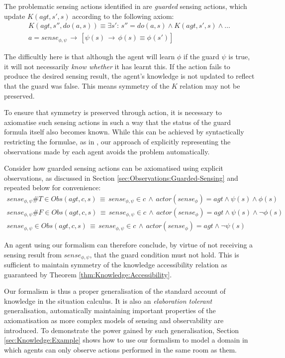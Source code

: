 The problematic sensing actions identified in \citep{Petrick06thesis}
are \emph{guarded} sensing actions, which update $K(agt,s',s)$ according
to the following axiom:\begin{gather*}
K(agt,s'',do(a,s))\equiv\exists s':\, s''=do(a,s)\wedge K(agt,s',s)\wedge\dots\\
a=sense_{\phi,\psi}\,\rightarrow\,\left[\psi(s)\,\rightarrow\,\phi(s)\equiv\phi_{}(s')\right]\end{gather*}


The difficultly here is that although the agent will learn $\phi$
if the guard $\psi$ is true, it will not necessarily \emph{know whether}
it has learnt this. If the action fails to produce the desired sensing
result, the agent's knowledge is not updated to reflect that the guard
was false. This means symmetry of the $K$ relation may not be preserved.

To ensure that symmetry is preserved through action, it is necessary
to axiomatise such sensing actions in such a way that the status of
the guard formula itself also becomes known. While this can be achieved
by syntactically restricting the formulae, as in \citep{Petrick06thesis},
our approach of explicitly representing the observations made by each
agent avoids the problem automatically.

Consider how guarded sensing actions can be axiomatised using explicit
observations, as discussed in Section \ref{sec:Observations:Guarded-Sensing}
and repeated below for convenience:\begin{gather*}
sense_{\phi,\psi}\#T\in Obs(agt,c,s)\,\equiv\, sense_{\phi,\psi}\in c\,\wedge\, actor(sense_{\phi})=agt\wedge\psi(s)\wedge\phi(s)\\
sense_{\phi,\psi}\#F\in Obs(agt,c,s)\,\equiv\, sense_{\phi,\psi}\in c\,\wedge\, actor(sense_{\phi})=agt\wedge\psi(s)\wedge\neg\phi(s)\\
sense_{\phi,\psi}\in Obs(agt,c,s)\,\equiv\, sense_{\phi,\psi}\in c\,\wedge\, actor(sense_{\phi})=agt\wedge\neg\psi(s)\end{gather*}


An agent using our formalism can therefore conclude, by virtue of
not receiving a sensing result from $sense_{\phi,\psi}$, that the
guard condition must not hold. This is sufficient to maintain symmetry
of the knowledge accessibility relation as guaranteed by Theorem \ref{thm:Knowledge:Accessibility}.

Our formalism is thus a proper generalisation of the standard account
of knowledge in the situation calculus. It is also an \emph{elaboration
tolerant} generalisation, automatically maintaining important properties
of the axiomatisation as more complex models of sensing and observability
are introduced. To demonstrate the power gained by such generalisation,
Section \ref{sec:Knowledge:Example} shows how to use our formalism
to model a domain in which agents can only observe actions performed
in the same room as them.


